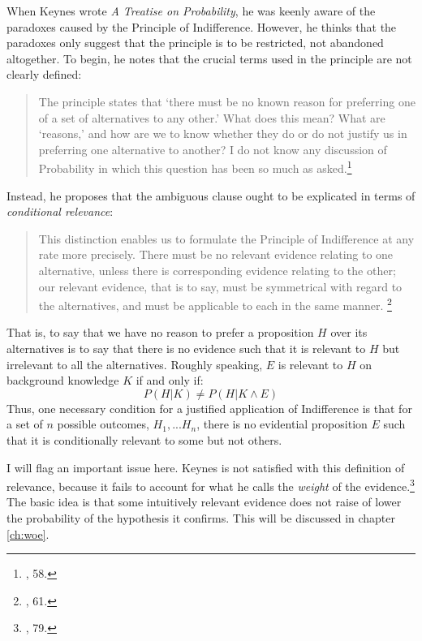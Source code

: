 When Keynes wrote \emph{A Treatise on Probability}, he was keenly aware
of the paradoxes caused by the Principle of Indifference. However, he
thinks that the paradoxes only suggest that the principle is to be
restricted, not abandoned altogether. To begin, he notes that the
crucial terms used in the principle are not clearly defined:

\begin{quote}
The principle states that `there must be no known reason for preferring
one of a set of alternatives to any other.' What does this mean? What
are `reasons,' and how are we to know whether they do or do not justify
us in preferring one alternative to another? I do not know any
discussion of Probability in which this question has been so much as
asked.\footnote{\cite{keynes}, 58.}
\end{quote}

Instead, he proposes that the ambiguous clause ought to be explicated in terms of
\emph{conditional relevance}: 

\begin{quote}
This distinction enables us to formulate the Principle of Indifference at any rate more precisely. There must be no relevant evidence relating to one alternative, unless there is corresponding evidence relating to the other; our relevant evidence, that is to say, must be symmetrical with regard to the alternatives, and must be applicable to each in the same manner.	\footnote{\cite{keynes}, 61.}
\end{quote}


That is, to say that we have no reason to prefer
a proposition \(H\) over its alternatives is to say that there is no
evidence such that it is relevant to \(H\) but irrelevant to all the
alternatives. Roughly speaking, \(E\) is relevant to \(H\) on background
knowledge \(K\) if and only if: \[P(H|K) \neq P(H|K\wedge E)\] Thus, one necessary condition for a justified application
of Indifference is that for a set of \(n\) possible outcomes,
\(H_1,...H_n\), there is no evidential proposition \(E\) such that it is
conditionally relevant to some but not others. 

I will flag an important issue here. Keynes is not satisfied with this definition of relevance, because it fails to account for what he calls the \emph{weight} of the evidence.\footnote{\cite{keynes}, 79.} The basic idea is that some intuitively relevant evidence does not raise of lower the probability of the hypothesis it confirms. This will be discussed in chapter \ref{ch:woe}.

